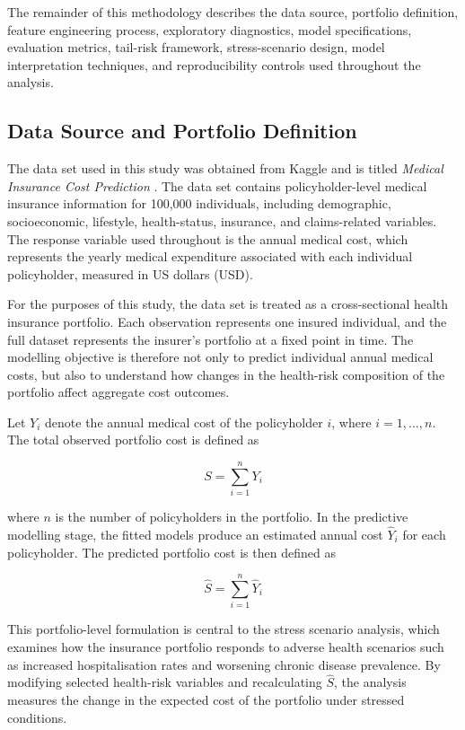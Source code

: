     The remainder of this methodology describes the data source, portfolio definition, feature engineering process, exploratory diagnostics, model specifications, evaluation metrics, tail-risk framework, stress-scenario design, model interpretation techniques, and reproducibility controls used throughout the analysis.
    
	\subsection{Data Source and Portfolio Definition}
	
	The data set used in this study was obtained from Kaggle and is titled \textit{Medical Insurance Cost Prediction} \cite{mohankrishnathalla_medical_insurance_cost_prediction}. The data set contains policyholder-level medical insurance information for 100,000 individuals, including demographic, socioeconomic, lifestyle, health-status, insurance, and claims-related variables. The response variable used throughout is the annual medical cost, which represents the yearly medical expenditure associated with each individual policyholder, measured in US dollars (USD).
	
	For the purposes of this study, the data set is treated as a cross-sectional health insurance portfolio. Each observation represents one insured individual, and the full dataset represents the insurer's portfolio at a fixed point in time. The modelling objective is therefore not only to predict individual annual medical costs, but also to understand how changes in the health-risk composition of the portfolio affect aggregate cost outcomes.
	
	Let \(Y_i\) denote the annual medical cost of the policyholder \(i\), where \(i = 1, \ldots, n\). The total observed portfolio cost is defined as
	
	\begin{equation} \label{eq:1}
		S = \sum_{i=1}^{n} Y_i
	\end{equation}
	
	where \(n\) is the number of policyholders in the portfolio. In the predictive modelling stage, the fitted models produce an estimated annual cost \(\hat{Y}_i\) for each policyholder. The predicted portfolio cost is then defined as
	
	\begin{equation} \label{eq:2}
		\hat{S} = \sum_{i=1}^{n} \hat{Y}_i
	\end{equation}
	
	This portfolio-level formulation is central to the stress scenario analysis, which examines how the insurance portfolio responds to adverse health scenarios such as increased hospitalisation rates and worsening chronic disease prevalence. By modifying selected health-risk variables and recalculating \(\hat{S}\), the analysis measures the change in the expected cost of the portfolio under stressed conditions.
	
